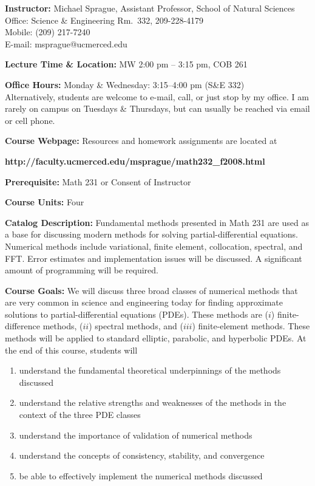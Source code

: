 \documentclass{article}
\begin{document}
\sloppy 
\textbf{Instructor:} 
Michael Sprague, Assistant Professor, School of Natural Sciences\\ 
Office: Science \& Engineering Rm.~332, 209-228-4179\\
Mobile: (209) 217-7240\\
E-mail: msprague@ucmerced.edu

\textbf{Lecture Time \& Location:} MW 2:00 pm -- 3:15 pm, COB 261

\textbf{Office Hours:} Monday \& Wednesday:  3:15--4:00 pm  (S\&E 332)\\
Alternatively, students are welcome to e-mail, call, or just stop by my
office.  I am rarely on campus on Tuesdays \& Thursdays, but can usually be
reached via email or cell phone.

\textbf{Course Webpage:} Resources and homework assignments are located at
\vspace{-0.15in}
\begin{center}
   \textbf{http://faculty.ucmerced.edu/msprague/math232\_f2008.html}
\end{center}

\textbf{Prerequisite:} Math 231 or Consent of Instructor 

\textbf{Course Units:} Four

\textbf{Catalog Description:} 
Fundamental methods presented in Math 231 are used as a base for discussing
modern methods for solving partial-differential equations.  Numerical
methods include variational, finite element, collocation,  spectral, and
FFT. Error estimates and implementation issues will be discussed.  A
significant amount of programming will be required.

\textbf{Course Goals:}
%
We will discuss three broad classes of numerical methods that are very
common in science and engineering today  for finding approximate solutions
to partial-differential equations (PDEs).  These methods are  ($i$)
finite-difference methods, ($ii$) spectral methods, and ($iii$)
finite-element methods.  These methods will be applied to standard elliptic,
parabolic, and hyperbolic PDEs.  At the end of this course, students will 

\vspace{-0.1in}
\begin{enumerate}

\item understand the fundamental theoretical underpinnings of the methods
discussed

\item understand the relative strengths and weaknesses of the methods in the
context of the three PDE classes

\item understand the importance of validation of numerical methods

\item understand the concepts of consistency, stability, and convergence

\item be able to effectively implement the numerical methods discussed

\end{enumerate}
\end{document}
